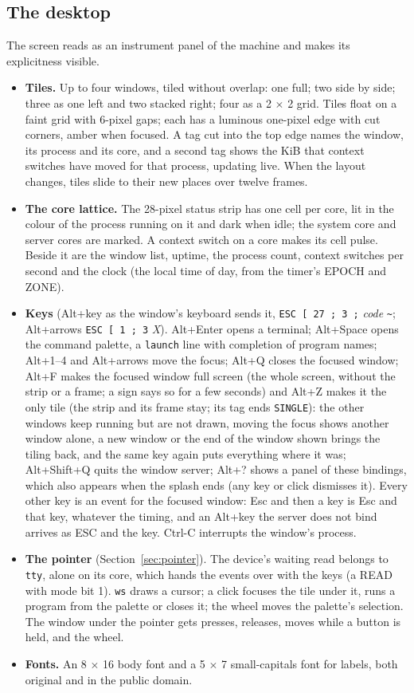 \subsection{The desktop}
The screen reads as an instrument panel of the machine and makes its explicitness visible.
\begin{itemize}
\item \textbf{Tiles.} Up to four windows, tiled without overlap: one full; two side by side; three as
  one left and two stacked right; four as a 2 $\times$ 2 grid. Tiles float on a faint grid with 6-pixel
  gaps; each has a luminous one-pixel edge with cut corners, amber when focused. A tag cut into the top
  edge names the window, its process and its core, and a second tag shows the KiB that context switches
  have moved for that process, updating live. When the layout changes, tiles slide to their new places
  over twelve frames.
\item \textbf{The core lattice.} The 28-pixel status strip has one cell per core, lit in the colour of
  the process running on it and dark when idle; the system core and server cores are marked. A context
  switch on a core makes its cell pulse. Beside it are the window list, uptime, the process count,
  context switches per second and the clock (the local time of day, from the timer's EPOCH and ZONE).
\item \textbf{Keys} (Alt+key as the window's keyboard sends it, \texttt{ESC [ 27 ; 3 ;} \textit{code}
  \texttt{\textasciitilde}; Alt+arrows \texttt{ESC [ 1 ; 3} \textit{X}). Alt+Enter opens a terminal; Alt+Space opens the
  command palette, a \texttt{launch} line with completion of program names; Alt+1--4 and Alt+arrows move
  the focus; Alt+Q closes the focused window; Alt+F makes the focused window full screen (the whole
  screen, without the strip or a frame; a sign says so for a few seconds) and Alt+Z makes it the only
  tile (the strip and its frame stay; its tag ends \texttt{SINGLE}): the other windows keep running
  but are not drawn, moving the focus shows another window alone, a new window or the end of the
  window shown brings the tiling back, and the same key again puts everything where it was;
  Alt+Shift+Q quits the window server; Alt+? shows a panel
  of these bindings, which also appears when the splash ends (any key or click dismisses it). Every
  other key is an event for the focused window: Esc and then a key is Esc and that key, whatever the
  timing, and an Alt+key the server does not bind arrives as ESC and the key. Ctrl-C interrupts the
  window's process.
\item \textbf{The pointer} (Section~\ref{sec:pointer}). The device's waiting read belongs to
  \texttt{tty}, alone on its core, which hands the events over with the keys (a READ with mode bit 1).
  \texttt{ws} draws a cursor; a click focuses the tile under it, runs a program from the palette or
  closes it; the wheel moves the palette's selection. The window under the pointer gets presses,
  releases, moves while a button is held, and the wheel.
\item \textbf{Fonts.} An 8 $\times$ 16 body font and a 5 $\times$ 7 small-capitals font for labels,
  both original and in the public domain.
\end{itemize}

